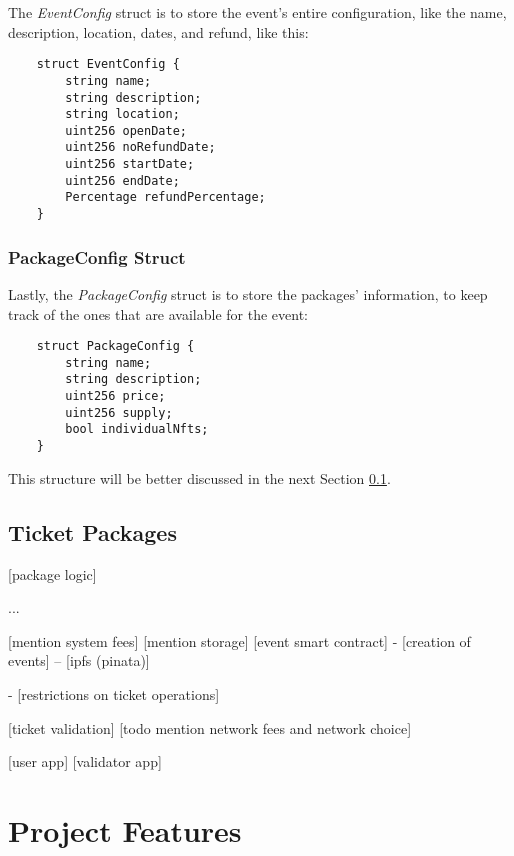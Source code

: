 The \textit{EventConfig} struct is to store the event's entire configuration, like the name, description, location, dates, and refund, like this:
\begin{verbatim}
    struct EventConfig {
        string name;
        string description;
        string location;
        uint256 openDate;
        uint256 noRefundDate;
        uint256 startDate;
        uint256 endDate;
        Percentage refundPercentage;
    }
\end{verbatim}

\subsubsection{PackageConfig Struct}

Lastly, the \textit{PackageConfig} struct is to store the packages' information, to keep track of the ones that are available for the event:
\begin{verbatim}
    struct PackageConfig {
        string name;
        string description;
        uint256 price;
        uint256 supply;
        bool individualNfts;
    }
\end{verbatim}
This structure will be better discussed in the next Section \ref{subsec:ticket_packages}.

\subsection{Ticket Packages}
\label{subsec:ticket_packages}

[package logic]

...


    [mention system fees]
    [mention storage]
    [event smart contract]
- [creation of events]
-- [ipfs (pinata)]

- [restrictions on ticket operations]

[ticket validation]
[todo mention network fees and network choice]

[user app]
[validator app]

\section{Project Features}
\label{sec:project_features}

